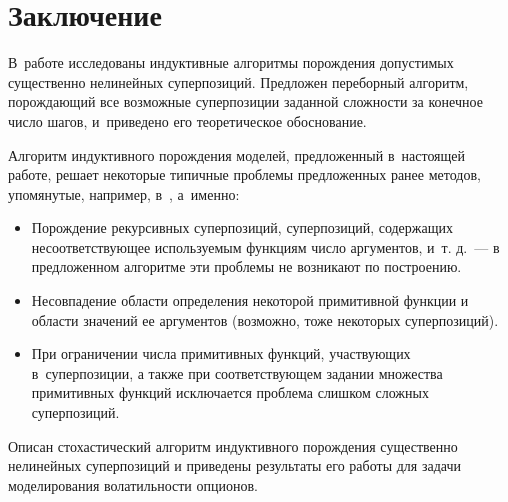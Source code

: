 \documentclass[12pt,a4paper]{amsart}
\begin{document}
\section{Заключение}

В~работе исследованы индуктивные алгоритмы порождения допустимых существенно
нелинейных суперпозиций. Предложен переборный алгоритм, порождающий все
возможные суперпозиции заданной сложности за конечное число шагов, и~приведено
его теоретическое обоснование. 

Алгоритм индуктивного порождения моделей, предложенный в~настоящей работе,
решает некоторые типичные проблемы предложенных ранее методов, упомянутые,
например, в~\cite{Zelinka2008}, а~именно:
\begin{itemize}
  \item Порождение рекурсивных суперпозиций, суперпозиций, содержащих
	несоответствующее используемым функциям число аргументов, и~т. д.~--- в
	предложенном алгоритме эти проблемы не возникают по построению.
  \item Несовпадение области определения некоторой примитивной функции и области
	значений ее аргументов (возможно, тоже некоторых суперпозиций).
  \item При ограничении числа примитивных функций, участвующих в~суперпозиции,
	а также при соответствующем задании множества примитивных функций
	исключается проблема слишком сложных суперпозиций.
\end{itemize}

Описан стохастический алгоритм индуктивного порождения существенно нелинейных
суперпозиций и приведены результаты его работы для задачи моделирования
волатильности опционов.


\extrasrussian

\end{document}
